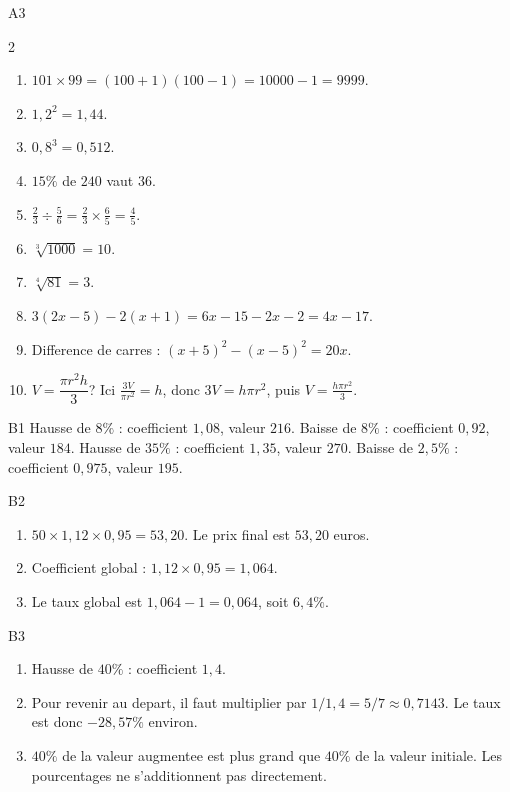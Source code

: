\documentclass[11pt,a4paper]{article}
\begin{document}
\begin{corrige}{A3}
\begin{multicols}{2}
\begin{enumerate}
    \item $101\times99=(100+1)(100-1)=10000-1=9999$.
    \item $1,2^2=1,44$.
    \item $0,8^3=0,512$.
    \item $15\%$ de $240$ vaut $36$.
    \item $\frac23\div\frac56=\frac23\times\frac65=\frac45$.
    \item $\sqrt[3]{1000}=10$.
    \item $\sqrt[4]{81}=3$.
    \item $3(2x-5)-2(x+1)=6x-15-2x-2=4x-17$.
    \item Difference de carres : $(x+5)^2-(x-5)^2=20x$.
    \item $V=\dfrac{\pi r^2h}{3}$? Ici $\frac{3V}{\pi r^2}=h$, donc $3V=h\pi r^2$, puis $V=\frac{h\pi r^2}{3}$.
\end{enumerate}
\end{multicols}
\end{corrige}

\begin{corrige}{B1}
Hausse de $8\%$ : coefficient $1,08$, valeur $216$. Baisse de $8\%$ : coefficient $0,92$, valeur $184$. Hausse de $35\%$ : coefficient $1,35$, valeur $270$. Baisse de $2,5\%$ : coefficient $0,975$, valeur $195$.
\end{corrige}

\begin{corrige}{B2}
\begin{enumerate}
    \item $50\times1,12\times0,95=53,20$. Le prix final est $53,20$ euros.
    \item Coefficient global : $1,12\times0,95=1,064$.
    \item Le taux global est $1,064-1=0,064$, soit $6,4\%$.
\end{enumerate}
\end{corrige}

\begin{corrige}{B3}
\begin{enumerate}
    \item Hausse de $40\%$ : coefficient $1,4$.
    \item Pour revenir au depart, il faut multiplier par $1/1,4=5/7\approx0,7143$. Le taux est donc $-28,57\%$ environ.
    \item $40\%$ de la valeur augmentee est plus grand que $40\%$ de la valeur initiale. Les pourcentages ne s'additionnent pas directement.
\end{enumerate}
\end{corrige}
\end{document}
